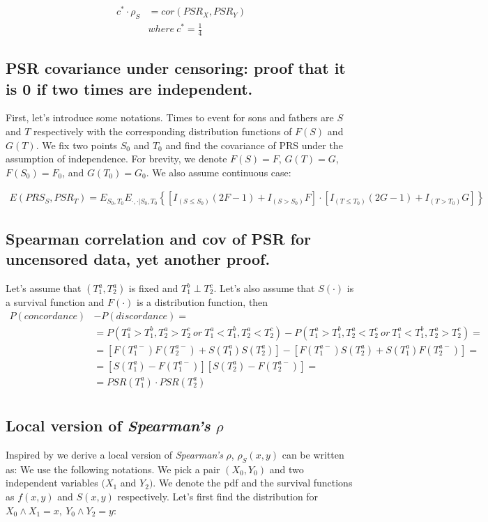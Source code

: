 \documentclass[]{article}
\begin{document}
	$$
	\begin{aligned}
		c^* \cdot \rho_S &= cor(PSR_X, PSR_Y)\\
    & where~c^*=\frac{1}{4}
	\end{aligned}
	$$
  
  

\subsection{PSR covariance under censoring: proof that it is 0 if two times are independent.}
First, let's introduce some notations. Times to event for sons and fathers are $S$ and $T$ respectively with the corresponding distribution functions of $F(S)$ and $G(T)$. We fix two points $S_0$ and $T_0$ and find the covariance of PRS under the assumption of independence. For brevity, we denote $F(S)=F$, $G(T)=G$, $F(S_0)=F_0$, and $G(T_0)=G_0$. We also assume continuous case:

	$$
	\begin{aligned}
    E(PRS_S, PSR_T) = E_{S_0,T_0} E_{\cdot, \cdot|S_0,T_0} \left\{   \left[ I_{(S\leq S_0)}(2F - 1) + I_{(S>S_0)}F \right] \cdot  \left[ I_{(T\leq T_0)}(2G - 1) + I_{(T>T_0)}G \right]    \right\}
	\end{aligned}
	$$



\subsection{Spearman correlation and cov of PSR for uncensored data, yet another proof.}
Let's assume that $(T^a_1, T^a_2)$ is fixed and $T^b_1 \perp T^c_2$. Let's also assume that $S(\cdot)$ is a survival function and $F(\cdot)$ is a distribution function, then
	$$
	\begin{aligned}
		P(concordance) &- P(discordance) = \\
      &=P(T^a_1>T^b_1, T^a_2 > T^c_2 ~or ~T^a_1<T^b_1, T^a_2 < T^c_2) - P(T^a_1>T^b_1, T^a_2 < T^c_2 ~or ~T^a_1<T^b_1, T^a_2 > T^c_2)=\\
      &=[F(T^{a-}_1)F(T^{a-}_2) + S(T^a_1) S(T^a_2)] - [ F(T^{a-}_1) S(T^a_2) + S(T^a_1)F(T^{a-}_2)]=\\
      &=[S(T^a_1) - F(T^{a-}_1)][S(T^{a}_2) -F(T^{a-}_2)]=\\
      &=PSR(T^a_1)\cdot PSR(T^a_2)\\
	\end{aligned}
	$$

\subsection{Local version of \emph{Spearman's} $\rho$}
Inspired by \cite{fan2000class} we derive a local version of \emph{Spearman's} $\rho$, $\rho_S(x, y)$ can be written as:
We use the following notations. We pick a pair $(X_{0},Y_{0})$ and two independent variables $(X_{1}$ and $Y_{2})$. We denote the pdf and the survival functions as $f(x,y)$ and $S(x,y)$ respectively. Let's first find the distribution for $X_{0}\wedge X_{1} = x,~Y_{0}\wedge Y_{2} = y$:
  
\end{document}
